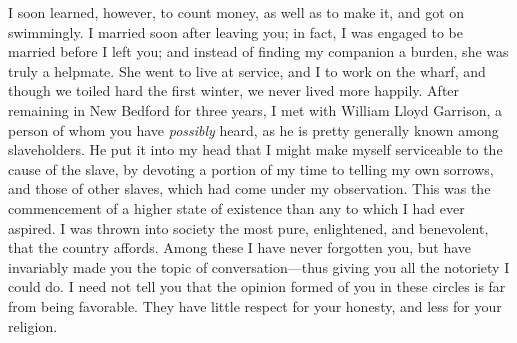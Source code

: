 I soon learned, however, to count money, as well as to make it, and got
on swimmingly. I married soon after leaving you; in fact, I was engaged
to be married before I left you; and instead of finding my companion a
burden, she was truly a helpmate. She went to live at service, and I to
work on the wharf, and though we toiled hard the first winter, we never
lived more happily. After remaining in New Bedford for three years, I
met with William Lloyd Garrison, a person of whom you have
\emph{possibly} heard, as he is pretty generally known among
slaveholders. He put it into my head that I might make myself
serviceable to the cause of the slave, by devoting a portion of my time
to telling my own sorrows, and those of other slaves, which had come
under my observation. This was the commencement of a higher state of
existence than any to which I had ever aspired. I was thrown into
society the most pure, enlightened, and benevolent, that the country
affords. Among these I have never forgotten you, but have invariably
made you the topic of conversation---thus giving you all the notoriety I
could do. I need not tell you that the opinion formed of you in these
circles is far from being favorable. They have little respect for your
honesty, and less for your religion.

